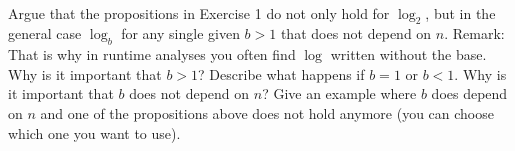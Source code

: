  \\
Argue that the propositions in Exercise 1 do not only hold for $\log_2$,
but in the general case $\log_b$ for any single given $b > 1$ that does not
depend on $n$.
Remark: That is why in runtime analyses you often find $\log$ written without
the base.
Why is it important that $b > 1$? Describe what happens if $b = 1$ or $b < 1$.
Why is it important that $b$ does not depend on $n$?
Give an example where $b$ does depend on $n$ and one of the propositions
above does not hold anymore (you can choose which one you want to use).